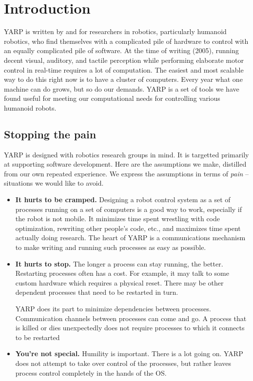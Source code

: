 \section{Introduction}

YARP is written by and for researchers in robotics, particularly
humanoid robotics, who find themselves with a complicated pile of
hardware to control with an equally complicated pile of software. At
the time of writing (2005), running decent visual, auditory, and
tactile perception while performing elaborate motor control in
real-time requires a lot of computation. The easiest and most scalable
way to do this right now is to have a cluster of computers. Every year
what one machine can do grows, but so do our demands. YARP is a set of
tools we have found useful for meeting our computational needs for
controlling various humanoid robots.

\subsection*{Stopping the pain}

YARP is designed with robotics research groups in mind.  
%
%
It is targetted primarily at supporting software development.
%
%
Here are the
assumptions we make, distilled from our own repeated experience.
We express the assumptions in terms of {\em pain} -- situations
we would like to avoid.

\begin{itemize}

\item {\bf It hurts to be cramped.}
%
Designing a robot control system as a set of processes running on
  a set of computers is a good way to work, especially if the robot
  is not mobile.  It minimizes time spent wrestling with code
  optimization, rewriting other people's code, etc., and maximizes
  time spent actually doing research.
  The heart of YARP is a communications mechanism to make writing
  and running such processes as easy as possible.


\item {\bf It hurts to stop.}
%
The longer a process can stay running, the better.  Restarting
  processes often has a cost.  For example, it may talk to some
  custom hardware which requires a physical reset.  There may
  be other dependent processes that need to be restarted in turn.

  YARP does its part to minimize dependencies between processes.
  Communication channels between processes can come and go.
  A process that is killed or dies unexpectedly does not
  require processes to which it connects to be restarted


\item {\bf You're not special.}
%
Humility is important.  There is a lot going on.
  YARP does not attempt to take over control of the processes,
  but rather leaves process control completely in the hands of
  the OS.


\end{itemize}



